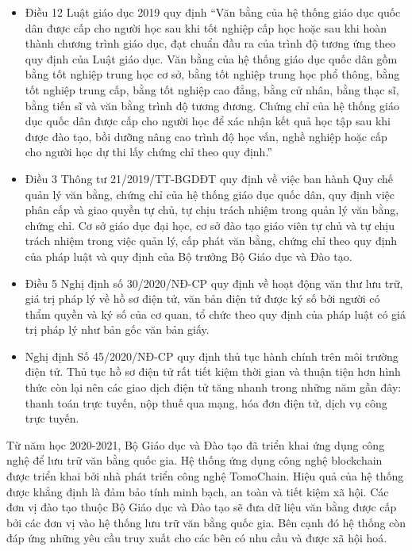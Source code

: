 \begin{itemize}
\item Điều 12 Luật giáo dục 2019 quy định “Văn bằng của hệ thống giáo dục quốc dân được cấp cho người học sau khi tốt nghiệp cấp học hoặc sau khi hoàn thành chương trình giáo dục, đạt chuẩn đầu ra của trình độ tương ứng theo quy định của Luật giáo dục. Văn bằng của hệ thống giáo dục quốc dân gồm bằng tốt nghiệp trung học cơ sở, bằng tốt nghiệp trung học phổ thông, bằng tốt nghiệp trung cấp, bằng tốt nghiệp cao đẳng, bằng cử nhân, bằng thạc sĩ, bằng tiến sĩ và văn bằng trình độ tương đương. Chứng chỉ của hệ thống giáo dục quốc dân được cấp cho người học để xác nhận kết quả học tập sau khi được đào tạo, bồi dưỡng nâng cao trình độ học vấn, nghề nghiệp hoặc cấp cho người học dự thi lấy chứng chỉ theo quy định.”

\item Điều 3 Thông tư 21/2019/TT-BGDĐT quy định về việc ban hành Quy chế quản lý văn bằng, chứng chỉ của hệ thống giáo dục quốc dân, quy định việc phân cấp và giao quyền tự chủ, tự chịu trách nhiệm trong quản lý văn bằng, chứng chỉ. Cơ sở giáo dục đại học, cơ sở đào tạo giáo viên tự chủ và tự chịu trách nhiệm trong việc quản lý, cấp phát văn bằng, chứng chỉ theo quy định của pháp luật và quy định của Bộ trưởng Bộ Giáo dục và Đào tạo.

\item Điều 5 Nghị định số 30/2020/NĐ-CP quy định về hoạt động văn thư lưu trữ, giá trị pháp lý về hồ sơ điện tử, văn bản điện tử được ký số bởi người có thẩm quyền và ký số của cơ quan, tổ chức theo quy định của pháp luật có giá trị pháp lý như bản gốc văn bản giấy.

\item Nghị định Số 45/2020/NĐ-CP quy định thủ tục hành chính trên môi trường điện tử. Thủ tục hồ sơ điện tử rất tiết kiệm thời gian và thuận tiện hơn hình thức còn lại nên các giao dịch điện tử tăng nhanh trong những năm gần đây: thanh toán trực tuyến, nộp thuế qua mạng, hóa đơn điện tử, dịch vụ công trực tuyến.
\end{itemize}

Từ năm học 2020-2021, Bộ Giáo dục và Đào tạo đã triển khai ứng dụng công nghệ để lưu trữ văn bằng quốc gia. Hệ thống ứng dụng công nghệ blockchain được triển khai bởi nhà phát triển công nghệ TomoChain. Hiệu quả của hệ thống được khẳng định là đảm bảo tính minh bạch, an toàn và tiết kiệm xã hội. Các đơn vị đào tạo thuộc Bộ Giáo dục và Đào tạo sẽ đưa dữ liệu văn bằng được cấp bởi các đơn vị vào hệ thống lưu trữ văn bằng quốc gia. Bên cạnh đó hệ thống còn đáp ứng những yêu cầu truy xuất cho các bên có nhu cầu và được xã hội hoá.

